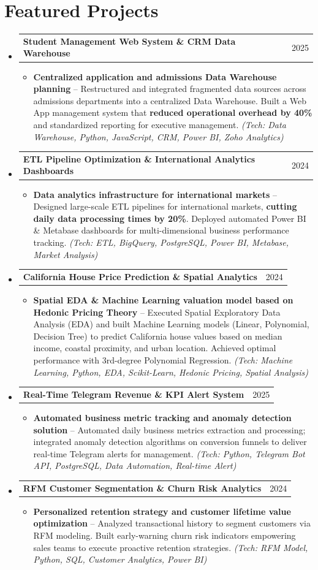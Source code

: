 \documentclass[letterpaper,11pt]{article}
\makeatletter
\newcommand{\resumeItem}[1]{
  \item\small{
    {#1 \vspace{1pt}}
  }
}
\newcommand{\resumeProjectHeading}[2]{
    \vspace{2pt}\item
    \begin{tabular*}{\textwidth}{l@{\extracolsep{\fill}}r}
      \small#1 & #2 \\
    \end{tabular*}\vspace{-2pt}
}
\newcommand{\resumeSubHeadingListStart}{\begin{itemize}[leftmargin=0.15in, label={}]}
\newcommand{\resumeSubHeadingListEnd}{\end{itemize}}
\newcommand{\resumeItemListStart}{\begin{itemize}[leftmargin=0.15in, itemsep=2.5pt, topsep=2pt, parsep=1.5pt]}
\newcommand{\resumeItemListEnd}{\end{itemize}\vspace{2pt}}
\makeatother
\begin{document}
\section*{Featured Projects}
  \resumeSubHeadingListStart
        \resumeProjectHeading
      {\textbf{Student Management Web System \& CRM Data Warehouse}}{2025}
      \resumeItemListStart
        \resumeItem{\textbf{Centralized application and admissions Data Warehouse planning} -- Restructured and integrated fragmented data sources across admissions departments into a centralized Data Warehouse. Built a Web App management system that \textbf{reduced operational overhead by 40\%} and standardized reporting for executive management. \emph{(Tech: Data Warehouse, Python, JavaScript, CRM, Power BI, Zoho Analytics)}}
      \resumeItemListEnd
    \resumeProjectHeading
      {\textbf{ETL Pipeline Optimization \& International Analytics Dashboards}}{2024}
      \resumeItemListStart
        \resumeItem{\textbf{Data analytics infrastructure for international markets} -- Designed large-scale ETL pipelines for international markets, \textbf{cutting daily data processing times by 20\%}. Deployed automated Power BI \& Metabase dashboards for multi-dimensional business performance tracking. \emph{(Tech: ETL, BigQuery, PostgreSQL, Power BI, Metabase, Market Analysis)}}
      \resumeItemListEnd
    \resumeProjectHeading
      {\textbf{California House Price Prediction \& Spatial Analytics}}{2024}
      \resumeItemListStart
        \resumeItem{\textbf{Spatial EDA \& Machine Learning valuation model based on Hedonic Pricing Theory} -- Executed Spatial Exploratory Data Analysis (EDA) and built Machine Learning models (Linear, Polynomial, Decision Tree) to predict California house values based on median income, coastal proximity, and urban location. Achieved optimal performance with 3rd-degree Polynomial Regression. \emph{(Tech: Machine Learning, Python, EDA, Scikit-Learn, Hedonic Pricing, Spatial Analysis)}}
      \resumeItemListEnd
    \resumeProjectHeading
      {\textbf{Real-Time Telegram Revenue \& KPI Alert System}}{2025}
      \resumeItemListStart
        \resumeItem{\textbf{Automated business metric tracking and anomaly detection solution} -- Automated daily business metrics extraction and processing; integrated anomaly detection algorithms on conversion funnels to deliver real-time Telegram alerts for management. \emph{(Tech: Python, Telegram Bot API, PostgreSQL, Data Automation, Real-time Alert)}}
      \resumeItemListEnd
    \resumeProjectHeading
      {\textbf{RFM Customer Segmentation \& Churn Risk Analytics}}{2024}
      \resumeItemListStart
        \resumeItem{\textbf{Personalized retention strategy and customer lifetime value optimization} -- Analyzed transactional history to segment customers via RFM modeling. Built early-warning churn risk indicators empowering sales teams to execute proactive retention strategies. \emph{(Tech: RFM Model, Python, SQL, Customer Analytics, Power BI)}}
      \resumeItemListEnd
  \resumeSubHeadingListEnd
\end{document}

